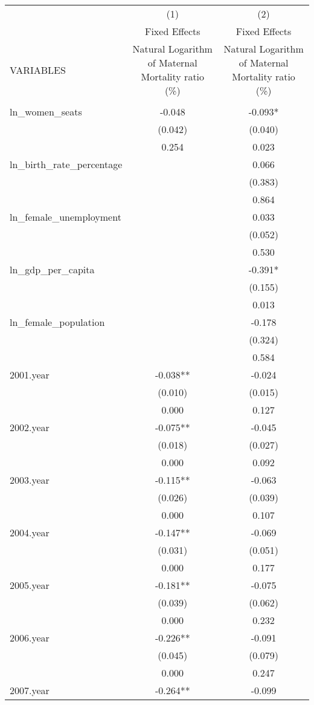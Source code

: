 \begin{tabular}{lcc} \hline
 & (1) & (2) \\
 & Fixed Effects & Fixed Effects \\
VARIABLES & Natural Logarithm of Maternal Mortality ratio (\%) & Natural Logarithm of Maternal Mortality ratio (\%) \\ \hline
 &  &  \\
ln\_women\_seats & -0.048 & -0.093* \\
 & (0.042) & (0.040) \\
 & 0.254 & 0.023 \\
ln\_birth\_rate\_percentage &  & 0.066 \\
 &  & (0.383) \\
 &  & 0.864 \\
ln\_female\_unemployment &  & 0.033 \\
 &  & (0.052) \\
 &  & 0.530 \\
ln\_gdp\_per\_capita &  & -0.391* \\
 &  & (0.155) \\
 &  & 0.013 \\
ln\_female\_population &  & -0.178 \\
 &  & (0.324) \\
 &  & 0.584 \\
2001.year & -0.038** & -0.024 \\
 & (0.010) & (0.015) \\
 & 0.000 & 0.127 \\
2002.year & -0.075** & -0.045 \\
 & (0.018) & (0.027) \\
 & 0.000 & 0.092 \\
2003.year & -0.115** & -0.063 \\
 & (0.026) & (0.039) \\
 & 0.000 & 0.107 \\
2004.year & -0.147** & -0.069 \\
 & (0.031) & (0.051) \\
 & 0.000 & 0.177 \\
2005.year & -0.181** & -0.075 \\
 & (0.039) & (0.062) \\
 & 0.000 & 0.232 \\
2006.year & -0.226** & -0.091 \\
 & (0.045) & (0.079) \\
 & 0.000 & 0.247 \\
2007.year & -0.264** & -0.099 \\

\end{tabular}
